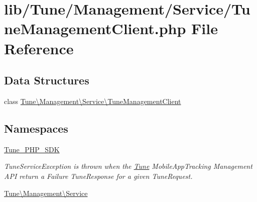 \hypertarget{TuneManagementClient_8php}{\section{lib/\-Tune/\-Management/\-Service/\-Tune\-Management\-Client.php File Reference}
\label{TuneManagementClient_8php}
}
\subsection*{Data Structures}
\begin{DoxyCompactItemize}
\item 
class \hyperlink{classTune_1_1Management_1_1Service_1_1TuneManagementClient}{Tune\textbackslash{}\-Management\textbackslash{}\-Service\textbackslash{}\-Tune\-Management\-Client}
\end{DoxyCompactItemize}
\subsection*{Namespaces}
\begin{DoxyCompactItemize}
\item 
\hyperlink{namespaceTune__PHP__SDK}{Tune\-\_\-\-P\-H\-P\-\_\-\-S\-D\-K}
\begin{DoxyCompactList}\small\item\em Tune\-Service\-Exception is thrown when the \hyperlink{namespaceTune}{Tune} Mobile\-App\-Tracking Management A\-P\-I return a Failure Tune\-Response for a given Tune\-Request. \end{DoxyCompactList}\item 
\hyperlink{namespaceTune_1_1Management_1_1Service}{Tune\textbackslash{}\-Management\textbackslash{}\-Service}
\end{DoxyCompactItemize}

